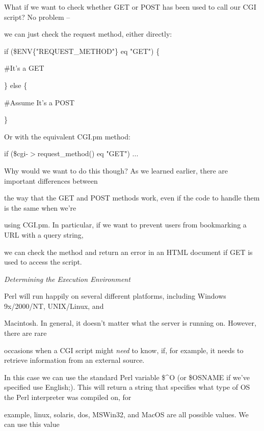 \documentclass[a4paper,11pt]{book}
\begin{document}
\noindent What if we want to check whether GET or POST has been used to call our CGI script? No problem --

\noindent we can just check the request method, either directly:

\noindent 

\noindent if (\$ENV\{"REQUEST\_METHOD"\} eq "GET") \{

\noindent \#It's a GET

\noindent \} else \{

\noindent \#Assume It's a POST

\noindent \}

\noindent 

\noindent 

\noindent Or with the equivalent CGI.pm method:

\noindent 

\noindent if (\$cgi-$>$request\_method() eq "GET") ...

\noindent 

\noindent Why would we want to do this though? As we learned earlier, there are important differences between

\noindent the way that the GET and POST methods work, even if the code to handle them is the same when we're

\noindent using CGI.pm. In particular, if we want to prevent users from bookmarking a URL with a query string,

\noindent we can check the method and return an error in an HTML document if GET is used to access the script.

\noindent 

\noindent \textit{Determining the Execution Environment}

\noindent Perl will run happily on several different platforms, including Windows 9x/2000/NT, UNIX/Linux, and

\noindent Macintosh. In general, it doesn't matter what the server is running on. However, there are rare

\noindent occasions when a CGI script might \textit{need }to know, if, for example, it needs to retrieve information from an external source.

\noindent 

\noindent In this case we can use the standard Perl variable \$\^{}O (or \$OSNAME if we've specified use English;). This will return a string that specifies what type of OS the Perl interpreter was compiled on, for

\noindent example, linux, solaris, dos, MSWin32,   and MacOS are all possible values. We can use this value
\end{document}
